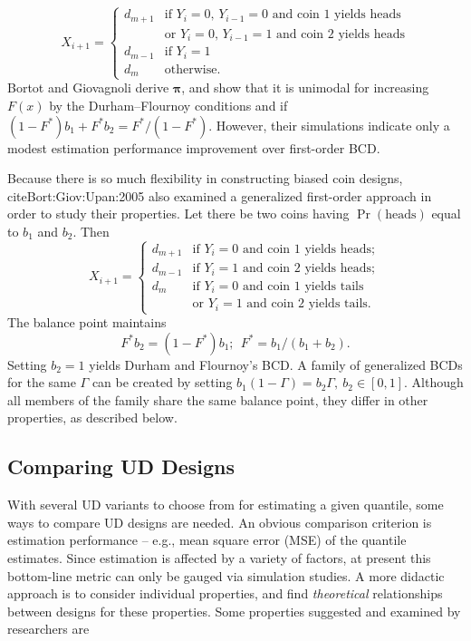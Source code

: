 \begin{equation*}
X_{i+1}=
\begin{cases}
d_{m+1} &\textrm{if $Y_i=0$, $Y_{i-1}=0$ and coin 1 yields heads}\\
        &\textrm{or $Y_i=0$, $Y_{i-1}=1$ and coin 2 yields heads}\\
d_{m-1} &\textrm{if $Y_i=1$}\\
d_m &\textrm{otherwise.}
\end{cases}
\end{equation*}
%
Bortot and Giovagnoli derive $\boldsymbol{\pi}$, and show that it is unimodal for increasing $F(x)$ by the Durham--Flournoy
conditions and if $(1-F^*)b_1+F^*b_2=F^*/(1-F^*)$. However, their simulations indicate only a modest estimation performance improvement over first-order BCD.

Because there is so much flexibility in constructing biased coin designs, cite{Bort:Giov:Upan:2005} also examined a generalized first-order approach in order to study their properties. Let there be two coins having $\Pr\left(\textrm{heads}\right)$ equal to $b_1$ and $b_2$. Then
\begin{equation}\label{eq:BortotCombo}
X_{i+1}=
\begin{cases}
d_{m+1} &\textrm{if $Y_i=0$ and coin 1 yields heads};\\
d_{m-1} &\textrm{if $Y_i=1$ and coin 2 yields heads};\\
d_{m} &\textrm{if $Y_i=0$ and coin 1 yields tails}\\
        &\textrm{or $Y_i=1$ and coin 2 yields tails.}
\end{cases}
\end{equation}
\noindent The balance point maintains
\begin{equation*}
F^*b_2=\left(1-F^*\right)b_1;\ \ F^*=b_1/(b_1+b_2).
\end{equation*}
\noindent Setting $b_2=1$ yields Durham and Flournoy's BCD. A family of generalized BCDs for the same $\Gamma$ can be created by setting $b_1(1-\Gamma)=b_2\Gamma,\ b_2\in [0,1]$. Although all members of the family share the same balance point, they differ in other properties, as described below.

\subsection{Comparing UD Designs}

With several UD variants to choose from for estimating a given quantile, some ways to compare UD designs are needed. An obvious comparison criterion is estimation performance -- e.g., mean square error (MSE) of the quantile estimates. Since estimation is affected by a variety of factors, at present this bottom-line metric can only be gauged via simulation studies. A more didactic approach is to consider individual properties, and find \emph{theoretical} relationships between designs for these properties. Some properties suggested and examined by researchers are

